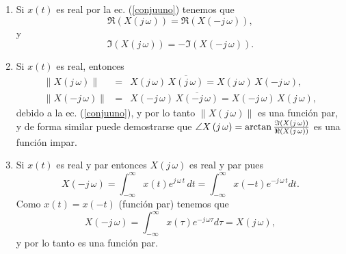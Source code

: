 \begin{enumerate}
\item  Si $x\left( t\right) $ es real por la ec. (\ref{conjuuno})
tenemos que 
\begin{equation}
\Re\left( X\left( j \, \omega \right) \right) =
\Re\left(X\left(-j \, \omega \right) \right),
\end{equation}
y 
\begin{equation}
 \Im\left( X\left( j \, \omega \right) \right) =
-\Im\left( X\left(-j \, \omega \right) \right).
\end{equation}

\item  Si $x\left( t\right) $ es real, entonces 
\begin{eqnarray}
\left\| X\left( j \, \omega \right) \right\| &=&
        X\left( j \, \omega \right) \, \overline{X\left( j \, \omega \right)} =
        X\left( j \, \omega \right) \, X\left( -j \, \omega \right) ,
\\
\left\| X\left( -j \, \omega \right) \right\| &=&
X\left( -j \, \omega \right) \, \overline{X\left( -j \, \omega \right)} =
X\left( -j \, \omega \right) \, X\left( j \, \omega \right) ,
\end{eqnarray}
debido a la ec. (\ref{conjuuno}), y por lo tanto $\left\| X\left( j \, \omega
\right) \right\| $ es una funci\'{o}n par, y de forma similar puede
demostrarse que $\angle X\left( j \, \omega \right) =\arctan \frac{%
\Im\left( X\left( j \, \omega \right) \right) }{\Re\left( X\left(
j \, \omega \right) \right) }$ es una funci\'{o}n impar.

\item  Si $x\left( t\right) $ es real y par entonces 
$X\left( j \, \omega\right) $ es real y par pues 
\begin{equation}
X\left( -j \, \omega \right) =\int_{-\infty }^{\infty }x\left( t\right)
e^{j \, \omega \, t} \, dt=
\int_{-\infty }^{\infty }x\left( -t \right) e^{-j \, \omega \, t }dt .
\end{equation}
Como $x\left( t\right) = x\left( -t\right) $ (funci\'{o}n par) tenemos
que 
\begin{equation}
X\left( -j \, \omega \right) =\int_{-\infty }^{\infty }x\left( \tau \right)
e^{-j \, \omega \tau }d\tau =X\left( j \, \omega \right) ,
\end{equation}
y por lo tanto es una funci\'{o}n par.


\end{enumerate}
